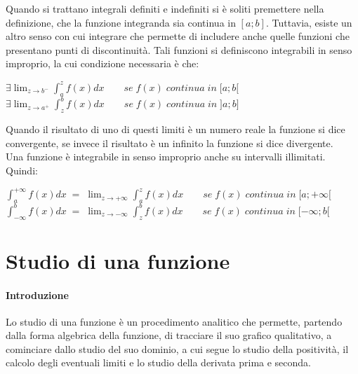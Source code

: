 \documentclass[a4paper,12pt]{report}
\begin{document}
Quando si trattano integrali definiti e indefiniti si è soliti premettere nella definizione, che la funzione integranda sia continua in $[a;b]$. Tuttavia, esiste un altro senso con cui integrare che permette di includere anche quelle funzioni che presentano punti di discontinuità. Tali funzioni si definiscono integrabili in senso improprio, la cui condizione necessaria è che: \\
\begin{center}
$\exists \lim_{z \to b^-}\int_{a}^{z}f(x)dx \qquad se\; f(x)\; continua\; in\; [a;b[ $ \\
\medskip
$\exists \lim_{z \to a^+}\int_{z}^{b}f(x)dx \qquad se\; f(x)\; continua\; in\; ]a;b]$
\end{center} 

Quando  il risultato di uno di questi limiti è un numero reale la funzione si dice convergente, se invece il risultato è un infinito la funzione si dice divergente. \\ 

Una funzione è integrabile in senso improprio anche su  intervalli illimitati. Quindi: \\
\begin{center}
$\int_{a}^{+\infty}f(x)dx\; =\; \lim_{z \to +\infty}\int_{a}^{z}f(x)dx \qquad se\; f(x)\; continua\; in\; [a;+\infty[$ \\
$\int_{-\infty}^{b}f(x)dx\; =\; \lim_{z \to -\infty}\int_{z}^{b}f(x)dx \qquad se\; f(x)\; continua\; in\; [-\infty;b[$
\end{center}
\newpage

\section{Studio di una funzione}
\paragraph{Introduzione}
Lo studio di una funzione è un procedimento analitico che permette, partendo dalla forma algebrica della funzione, di tracciare il suo grafico qualitativo, a cominciare dallo studio del suo dominio, a cui segue lo studio della positività, il calcolo degli eventuali limiti e lo studio della derivata prima e seconda. 
\end{document}
